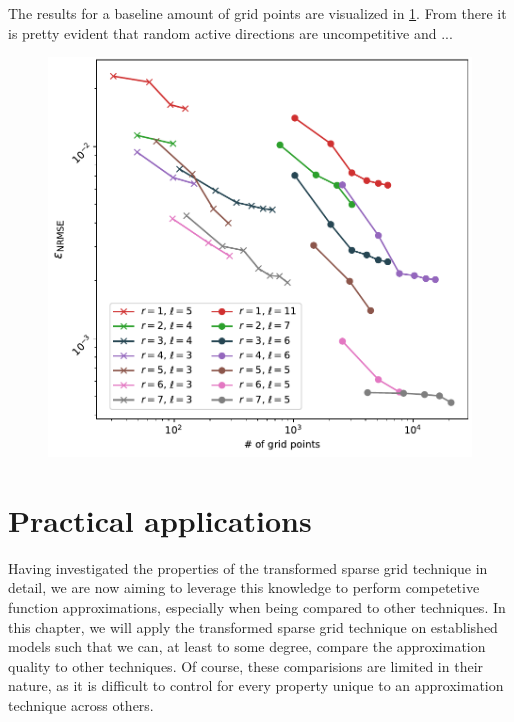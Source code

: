 \documentclass[
  a4paper,  %
  twoside,  %
  bibliography=totoc,
  headsepline,
  cleardoublepage=empty,
  parskip=half,
  draft=false
]{scrbook}
\begin{document}
The results for a baseline amount of grid points are visualized in \cref{fig:ww_comp}.
From there it is pretty evident that random active directions are uncompetitive and ...

\begin{mdframed}[style=style]
\begin{figure}[H]
\includegraphics[width=\textwidth]{graphics/wingweight_fixed}
\delimit
{}
\label{fig:ww_comp}
\end{figure}
\end{mdframed}


\chapter{Practical applications}
\label{chap:c8}

Having investigated the properties of the transformed sparse grid technique in detail, we are now aiming to leverage this knowledge to perform competetive function approximations, especially when being compared to other techniques.
In this chapter, we will apply the transformed sparse grid technique on established models such that we can, at least to some degree, compare the approximation quality to other techniques.
Of course, these comparisions are limited in their nature, as it is difficult to control for every property unique to an approximation technique across others.
\end{document}
